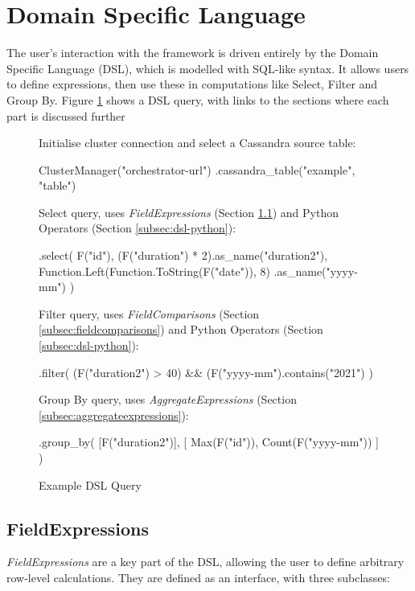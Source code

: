 \section{Domain Specific Language}
The user's interaction with the framework is driven entirely by the Domain Specific Language (DSL), which is modelled with SQL-like syntax. It allows users to define expressions, then use these in computations like Select, Filter and Group By. Figure \ref{fig:dsl-high-level-example} shows a DSL query, with links to the sections where each part is discussed further

\begin{figure}[htp]
	Initialise cluster connection and select a Cassandra source table:
	\begin{python}
ClusterManager("orchestrator-url")
  .cassandra_table("example", "table")
	\end{python}
	
	Select query, uses \textit{FieldExpressions} (Section \ref{subsec:fieldexpressions}) and Python Operators (Section \ref{subsec:dsl-python}):
	\begin{python}
  .select(
    F("id"),
    (F("duration") * 2).as_name("duration2"),
    Function.Left(Function.ToString(F("date")), 8)
      .as_name("yyyy-mm")
  )
	\end{python}

	Filter query, uses \textit{FieldComparisons} (Section \ref{subsec:fieldcomparisons}) and Python Operators (Section \ref{subsec:dsl-python}):
	\begin{python}
  .filter(
    (F("duration2") > 40) && 
  	(F("yyyy-mm").contains("2021")
  )
	\end{python}

	Group By query, uses \textit{AggregateExpressions} (Section \ref{subsec:aggregateexpressions}):
	\begin{python}
  .group_by(
    [F("duration2")],
    [
      Max(F("id")),
      Count(F("yyyy-mm"))
    ]
  )
	\end{python}
	\caption{Example DSL Query}
	\label{fig:dsl-high-level-example}
\end{figure}


\subsection{FieldExpressions}\label{subsec:fieldexpressions}
\textit{FieldExpressions} are a key part of the DSL, allowing the user to define arbitrary row-level calculations. They are defined as an interface, with three subclasses:

